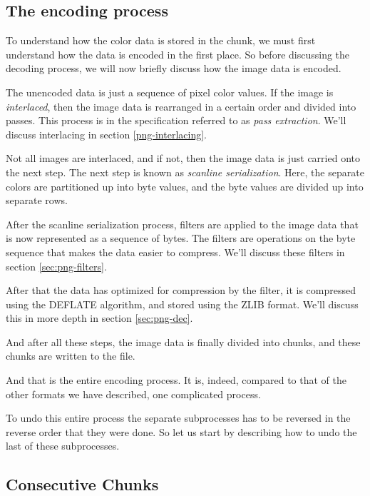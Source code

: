 \subsection{The encoding process}

To understand how the color data is stored in the \IDAT chunk, we must
first understand how the data is encoded in the first place. So before
discussing the decoding process, we will now briefly discuss how the
image data is encoded.

The unencoded data is just a sequence of pixel color values. If the
image is \textit{interlaced}, then the image data is rearranged in a
certain order and divided into passes. This process is in the \png
specification referred to as \textit{pass extraction}. We'll discuss
interlacing in section \ref{png-interlacing}.

Not all images are interlaced, and if not, then the image data is just
carried onto the next step. The next step is known as \textit{scanline
  serialization}. Here, the separate colors are partitioned up into
byte values, and the byte values are divided up into separate rows.



After the scanline serialization process, filters are applied to the
image data that is now represented as a sequence of bytes. The filters
are operations on the byte sequence that makes the data easier to
compress. We'll discuss these filters in section
\ref{sec:png-filters}.

After that the data has optimized for compression by the filter, it is
compressed using the DEFLATE algorithm, and stored using the ZLIB
format. We'll discuss this in more depth in section \ref{sec:png-dec}.

And after all these steps, the image data is finally divided into
\IDAT chunks, and these chunks are written to the file.

And that is the entire encoding process. It is, indeed, compared to
that of the other formats we have described, one complicated process.

To undo this entire process the separate subprocesses has to be
reversed in the reverse order that they were done. So let us start by
describing how to undo the last of these subprocesses.

\subsection{Consecutive Chunks}

